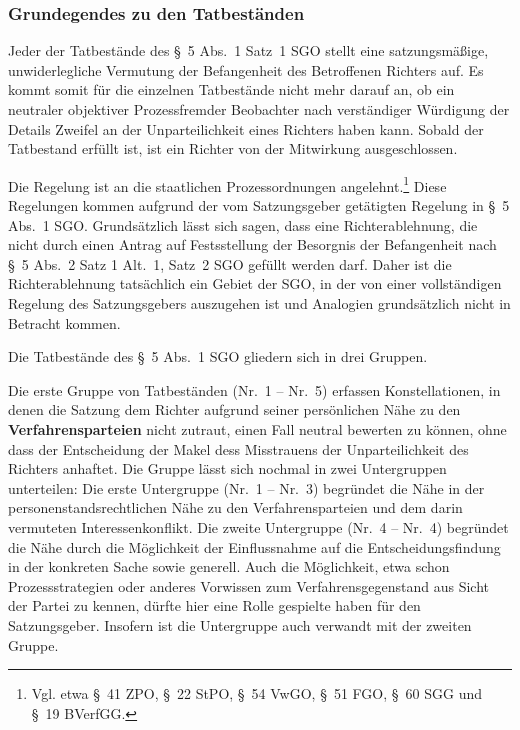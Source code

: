 \subsubsection{Grundegendes zu den Tatbeständen}
\label{Zusammensetzung:Spruchkoerper:Befangenheitsvermutung:Tatbestandsgrundsaetze}
Jeder der Tatbestände des \S~5 Abs.~1 Satz~1 SGO stellt eine satzungsmäßige, unwiderlegliche Vermutung der Befangenheit des Betroffenen Richters auf.
Es kommt somit für die einzelnen Tatbestände nicht mehr darauf an, ob ein neutraler objektiver Prozessfremder Beobachter nach verständiger Würdigung der Details Zweifel an der Unparteilichkeit eines Richters haben kann.
Sobald der Tatbestand erfüllt ist, ist ein Richter von der Mitwirkung ausgeschlossen.

Die Regelung ist an die staatlichen Prozessordnungen angelehnt.\footnote{Vgl. etwa \S~41 ZPO,  \S~22 StPO, \S~54 VwGO, \S~51 FGO, \S~60 SGG und \S~19 BVerfGG.}
Diese Regelungen kommen aufgrund der vom Satzungsgeber getätigten Regelung in \S~5 Abs.~1 SGO.
Grundsätzlich lässt sich sagen, dass eine Richterablehnung, die nicht durch einen Antrag auf Festsstellung der Besorgnis der Befangenheit nach \S~5 Abs.~2 Satz 1 Alt.~1, Satz~2 SGO gefüllt werden darf.
Daher ist die Richterablehnung tatsächlich ein Gebiet der SGO, in der von einer vollständigen Regelung des Satzungsgebers auszugehen ist und Analogien grundsätzlich nicht in Betracht kommen.

Die Tatbestände des \S~5 Abs.~1 SGO gliedern sich in drei Gruppen.

Die erste Gruppe von Tatbeständen (Nr.~1 -- Nr.~5) erfassen Konstellationen, in denen die Satzung dem Richter aufgrund seiner persönlichen Nähe zu den \textbf{Verfahrensparteien} nicht zutraut, einen Fall neutral bewerten zu können, ohne dass der Entscheidung der Makel dess Misstrauens der Unparteilichkeit des Richters anhaftet.
Die Gruppe lässt sich nochmal in zwei Untergruppen unterteilen:
Die erste Untergruppe (Nr.~1 -- Nr.~3) begründet die Nähe in der personenstandsrechtlichen Nähe zu den Verfahrensparteien und dem darin vermuteten Interessenkonflikt.
Die zweite Untergruppe (Nr.~4 -- Nr.~4) begründet die Nähe durch die Möglichkeit der Einflussnahme auf die Entscheidungsfindung in der konkreten Sache sowie generell. Auch die Möglichkeit, etwa schon Prozessstrategien oder anderes Vorwissen zum Verfahrensgegenstand aus Sicht der Partei zu kennen, dürfte hier eine Rolle gespielte haben für den Satzungsgeber. Insofern ist die Untergruppe auch verwandt mit der zweiten Gruppe.

